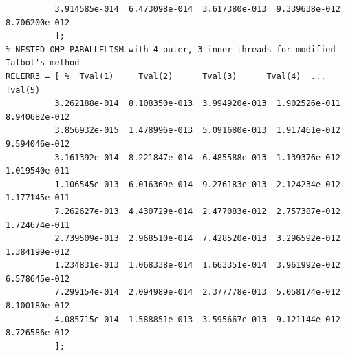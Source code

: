 \documentclass[a4paper,10pt]{report}%
\begin{document}
\begin{lstlisting}
          3.914585e-014  6.473098e-014  3.617380e-013  9.339638e-012  8.706200e-012
          ];
% NESTED OMP PARALLELISM with 4 outer, 3 inner threads for modified Talbot's method
RELERR3 = [ %  Tval(1)     Tval(2)      Tval(3)      Tval(4)  ... Tval(5)
          3.262188e-014  8.108350e-013  3.994920e-013  1.902526e-011  8.940682e-012
          3.856932e-015  1.478996e-013  5.091680e-013  1.917461e-012  9.594046e-012
          3.161392e-014  8.221847e-014  6.485588e-013  1.139376e-012  1.019540e-011
          1.106545e-013  6.016369e-014  9.276183e-013  2.124234e-012  1.177145e-011
          7.262627e-013  4.430729e-014  2.477083e-012  2.757387e-012  1.724674e-011
          2.739509e-013  2.968510e-014  7.428520e-013  3.296592e-012  1.384199e-012
          1.234831e-013  1.068338e-014  1.663351e-014  3.961992e-012  6.578645e-012
          7.299154e-014  2.094989e-014  2.377778e-013  5.058174e-012  8.100180e-012
          4.085715e-014  1.588851e-013  3.595667e-013  9.121144e-012  8.726586e-012
          ];
\end{lstlisting}
\end{document}
